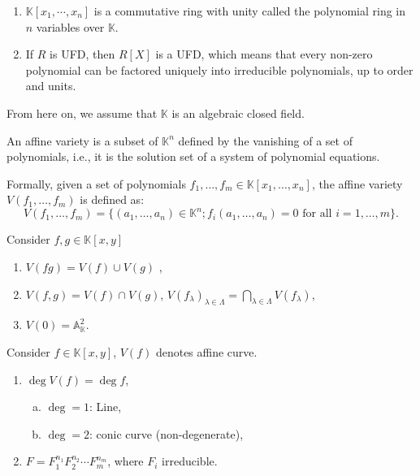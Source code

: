 \documentclass[10pt]{article}
\begin{document}
\begin{definition}

\end{definition}

\begin{proposition}
  \begin{enumerate}[(1)]
    \item   $ \mathbb{K}[x_1,\cdots ,x_{n}]$ is a commutative ring with unity called the polynomial ring in $ n$ variables over $ \mathbb{K}$.
    \item If $ R$ is UFD, then $ R[X]$ is a UFD, which means that every non-zero polynomial can be factored uniquely into irreducible polynomials, up to order and units.
  \end{enumerate}
\end{proposition}

From here on, we assume that $ \mathbb{K}$ is an algebraic closed field.
\begin{definition}
  An affine variety is a subset of $ \mathbb{K}^{n}$ defined by the vanishing of a set of polynomials, i.e., it is the solution set of a system of polynomial equations.

  Formally, given a set of polynomials $ f_1, \ldots, f_m \in \mathbb{K}[x_1,\ldots,x_n]$, the affine variety $ V(f_1, \ldots, f_m)$ is defined as:
  \begin{equation*}
    V(f_1, \ldots, f_m) = \{ (a_1, \ldots, a_n) \in \mathbb{K}^{n} ; f_i(a_1, \ldots, a_n) = 0 \text{ for all } i = 1, \ldots, m \}.
  \end{equation*}
\end{definition}

\begin{proposition}
  Consider $ f, g \in \mathbb{K}[x,y]$
  \begin{enumerate}[(1)]
    \item $V(fg) = V(f) \cup V(g)$ ,
    \item $ V(f, g) = V(f) \cap V(g)$, $ V(f_{\lambda})_{\lambda \in \Lambda} = \bigcap_{\lambda \in \Lambda} V(f_{\lambda})$,
    \item $ V(0) = \mathbb{A}_{\mathbb{K}}^{2}$.
  \end{enumerate}
\end{proposition}

\begin{definition}
  Consider $ f \in \mathbb{K}[x,y]$, $ V(f)$ denotes affine curve.
  \begin{enumerate}[(1)]
    \item $ \deg V(f) = \deg f$,
      \begin{enumerate}[(a)]
        \item $\deg = 1$: Line,
        \item $\deg = 2$: conic curve (non-degenerate),
      \end{enumerate}
    \item $ F = F_{1}^{n_1} F_2^{n_2} \cdots F_{m}^{n_{m}}$, where $ F_{i}$ irreducible.
  \end{enumerate}
\end{definition}
\end{document}
